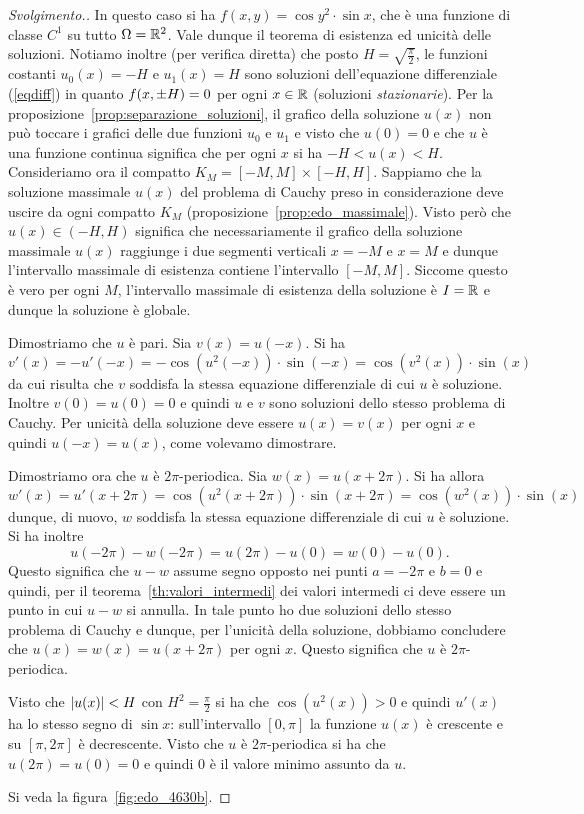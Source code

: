\begin{proof}[Svolgimento.]
In questo caso si ha $f(x,y)=\cos y^2\cdot \sin x$, che \`e una funzione
di classe $C^1$ su tutto $\Omega={\mathbb R}^2$.
Vale dunque il teorema di esistenza ed
unicità delle soluzioni.
Notiamo inoltre (per verifica diretta)
che posto $H=\sqrt{\frac \pi 2}$, le funzioni 
costanti $u_0(x)=-H$ e $u_1(x)=H$ sono
soluzioni dell'equazione differenziale (\ref{eqdiff})
in quanto $f{\left( x,\pm H \right)}=0$ per ogni $x\in {\mathbb R}$
(soluzioni \emph{stazionarie}).
Per la proposizione~\ref{prop:separazione_soluzioni},
il grafico della soluzione $u(x)$
non può toccare i grafici delle due funzioni $u_0$ e $u_1$ e visto
che $u(0)=0$ e che $u$ è una funzione continua significa
che per ogni $x$ si ha $-H < u(x) < H$.
Consideriamo ora il compatto
$K_M=[-M,M] \times [-H,H]$.
Sappiamo che la soluzione
massimale $u(x)$ del problema di Cauchy preso in considerazione deve
uscire da ogni compatto $K_M$
(proposizione~\ref{prop:edo_massimale}).
Visto però che $u(x)\in (-H,H)$ significa che necessariamente
il grafico della soluzione massimale $u(x)$
raggiunge i due segmenti verticali
$x=-M$ e $x=M$ e dunque l'intervallo massimale di esistenza
contiene l'intervallo $[-M,M]$.
Siccome questo è vero per ogni $M$, l'intervallo massimale
di esistenza della soluzione è $I={\mathbb R}$ e dunque la soluzione
è globale.

Dimostriamo che $u$ è pari. Sia $v(x)=u(-x)$. 
Si ha 
\[ 
    v'(x) = -u'(-x) 
    = -\cos(u^2(-x))\cdot \sin(-x) 
    = \cos(v^2(x))\cdot \sin(x)
\]
da cui risulta che $v$ soddisfa la stessa equazione differenziale 
di cui $u$ è soluzione. 
Inoltre $v(0)=u(0)=0$ e quindi $u$ e $v$ sono soluzioni dello 
stesso problema di Cauchy. Per unicità della soluzione 
deve essere $u(x)=v(x)$ per ogni $x$ e quindi $u(-x)=u(x)$, come 
volevamo dimostrare.
  
Dimostriamo ora che $u$ è $2\pi$-periodica.
Sia $w(x)=u(x+2\pi)$. Si ha allora 
\[
  w'(x) = u'(x+2\pi) = \cos(u^2(x+2\pi))\cdot \sin(x+2\pi) 
  = \cos(w^2(x))\cdot \sin(x) 
\]
dunque, di nuovo, $w$ soddisfa la stessa equazione differenziale
di cui $u$ è soluzione. Si ha inoltre 
\[
  u(-2\pi) - w(-2\pi) = u(2\pi) - u(0) = w(0) - u(0).
\]
Questo significa che $u-w$ assume segno opposto nei punti 
$a=-2\pi$ e $b=0$ e quindi, per il teorema~\ref{th:valori_intermedi}
dei valori intermedi ci deve essere un punto in cui 
$u-w$ si annulla. In tale punto ho due soluzioni dello stesso 
problema di Cauchy e dunque, per l'unicità della soluzione, 
dobbiamo concludere che $u(x)=w(x)=u(x+2\pi)$ per ogni $x$.
Questo significa che $u$ è $2\pi$-periodica.

Visto che ${\left|u(x)\right|}<H$ con $H^2=\frac \pi 2$ si ha che $\cos(u^2(x))>0$ 
e quindi $u'(x)$ ha lo stesso segno di $\sin x$: sull'intervallo 
$[0,\pi]$ la funzione $u(x)$ è crescente e su $[\pi,2\pi]$ è decrescente.
Visto che $u$ è $2\pi$-periodica si ha che $u(2\pi)=u(0)=0$ e quindi 
$0$ è il valore minimo assunto da $u$.

Si veda la figura~\ref{fig:edo_4630b}.
\end{proof}

